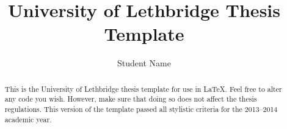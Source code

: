 \documentclass[math , phd , 12pt , final]{uleththesis}
\title{University of Lethbridge Thesis Template}
\author{Student Name}
\begin{document}
\frontmatter
 
\ulethtitle
\ulethapproval

\dedication{
  This is where the dedication goes. It is normally quite short. (This is an optional section)
} %

\begin{abstract}
 This is the University of Lethbridge thesis template for use in \LaTeX. Feel free to alter any code you wish. However, make sure that doing so does not affect the thesis regulations. This version of the template passed all stylistic criteria for the 2013--2014 academic year.
\end{abstract}


\tableofcontents
\listoftables
\listoffigures

\mainmatter





\appendix


\end{document}
